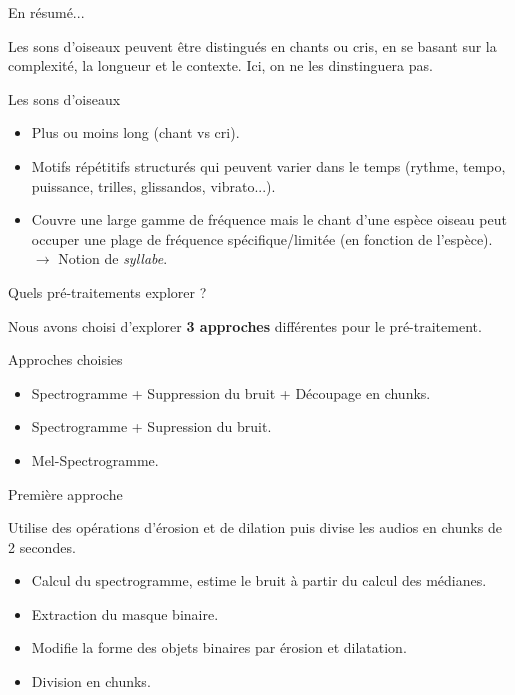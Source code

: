 \documentclass[compress,xcolor=table]{beamer}
\begin{document}
\begin{frame}{En résumé...}

    Les sons d'oiseaux peuvent être distingués en chants ou cris, en se basant sur la complexité, la longueur et le contexte. Ici, on ne les dinstinguera pas.

    \begin{block}{Les sons d'oiseaux}
        \begin{itemize}
            \item Plus ou moins long (chant vs cri).
            \item Motifs répétitifs structurés qui peuvent varier dans le temps (rythme, tempo, puissance, trilles, glissandos, vibrato...).
            \item Couvre une large gamme de fréquence mais le chant d'une espèce oiseau peut occuper une plage de fréquence spécifique/limitée (en fonction de l'espèce).\\
                  $\rightarrow$ Notion de \textit{syllabe}.
        \end{itemize}
    \end{block}

\end{frame}

\begin{frame}{Quels pré-traitements explorer ?}

    Nous avons choisi d'explorer \textbf{3 approches} différentes pour le pré-traitement.

    \begin{block}{Approches choisies}
        \begin{itemize}
            \item Spectrogramme + Suppression du bruit + Découpage en chunks.
            \item Spectrogramme + Supression du bruit.
            \item Mel-Spectrogramme.
        \end{itemize}
    \end{block}

\end{frame}

\begin{frame}{Première approche}

    \begin{block}{ \cite{sprengelAudioBasedBird2016}}
        Utilise des opérations d'érosion et de dilation puis divise les audios en chunks de 2 secondes.
        \begin{itemize}
            \item Calcul du spectrogramme, estime le bruit à partir du calcul des médianes.
            \item Extraction du masque binaire.
            \item Modifie la forme des objets binaires par érosion et dilatation.
            \item Division en chunks.
        \end{itemize}
    \end{block}

\end{frame}
\end{document}
